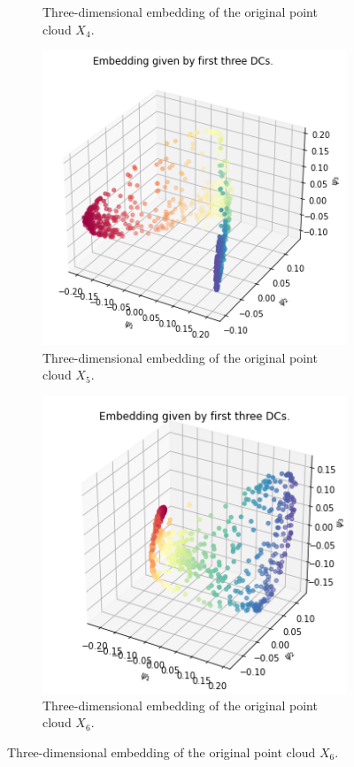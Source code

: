 \begin{figure}[H]
\begin{subfigure}[b]{0.3\textwidth}
    \caption{Three-dimensional embedding of the original point cloud $X_4$.}
\end{subfigure}
\hfill
\begin{subfigure}[b]{0.3\textwidth}
    \includegraphics[width=\textwidth]{figures/X5_embedding.png}
    \caption{Three-dimensional embedding of the original point cloud $X_5$.}
\end{subfigure}
\hfill
\begin{subfigure}[b]{0.3\textwidth}
    \includegraphics[width=\textwidth]{figures/X6_embedding.png}
    \caption{Three-dimensional embedding of the original point cloud $X_6$.}
\end{subfigure}
\end{figure}


